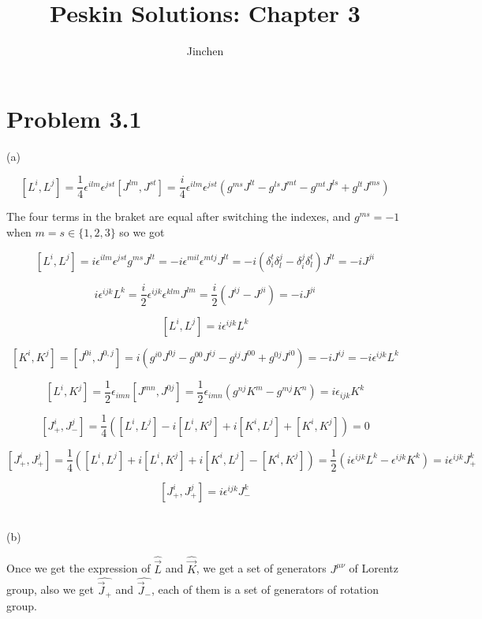 \documentclass[11pt]{article} %
\title{Peskin Solutions: Chapter 3}
\author{Jinchen}
\begin{document}
\maketitle

\section{Problem 3.1}

\noindent (a)

\[
    [L^i, L^j] = \frac{1}{4} \epsilon^{i l m} \epsilon^{j s t} [J^{l m}, J^{s t}] = \frac{i}{4} \epsilon^{i l m} \epsilon^{j s t} (g^{m s} J^{l t} - g^{l s} J^{m t} - g^{m t} J^{l s} + g^{l t} J^{m s})
\]

The four terms in the braket are equal after switching the indexes, and $g^{ms} = -1$ when $m = s \in \{1, 2, 3\}$ so we got

\[
    [L^i, L^j] = i \epsilon^{i l m} \epsilon^{j s t} g^{m s} J^{l t} = -i \epsilon^{m i l} \epsilon^{m t j} J^{l t} = -i (\delta_{i}^{t} \delta_{l}^{j} - \delta_{i}^{j} \delta_{l}^{t}) J^{lt} = -i J^{j i}
\]

\[
    i \epsilon^{ijk} L^k = \frac{i}{2} \epsilon^{i j k} \epsilon^{k l m} J^{lm} = \frac{i}{2} (J^{ij} - J^{ji}) = -i J^{j i}   
\]

\[
    [L^i, L^j] = i \epsilon^{ijk} L^k  
\]

\[
    [K^i, K^j] = [J^{0 i}, J^{0, j}] = i (g^{i 0} J^{0 j} - g^{0 0} J^{i j} - g^{i j} J^{0 0} + g^{0 j} J^{i 0}) = -i J^{i j} = -i \epsilon^{ijk} L^{k}   
\]

\[
    [L^i, K^j] = \frac{1}{2} \epsilon_{i m n} [J^{m n}, J^{0 j}] = \frac{1}{2} \epsilon_{i m n} (g^{n j} K^m - g^{m j} K^n) = i \epsilon_{i j k} K^{k}   
\]

\[
    [J_+^i, J_-^j] = \frac{1}{4} ([L^i, L^j] - i [L^i, K^j] + i [K^i, L^j] + [K^i, K^j]) = 0    
\]

\[
    [J_+^i, J_+^j] = \frac{1}{4} ([L^i, L^j] + i [L^i, K^j] + i [K^i, L^j] - [K^i, K^j]) = \frac{1}{2} (i \epsilon^{i j k} L^k - \epsilon^{i j k} K^k) = i \epsilon^{i j k} J_+^k    
\]

\[
    [J_+^i, J_+^j] = i \epsilon^{i j k} J_-^k    
\]

~\\
\noindent (b)

Once we get the expression of $\hat{\vec{L}}$ and $\hat{\vec{K}}$, we get a set of generators $J^{\mu \nu}$ of Lorentz group, also we get $\hat{\vec{J}_+}$ and $\hat{\vec{J}_-}$, each of them is a set of generators of rotation group.
\end{document}
